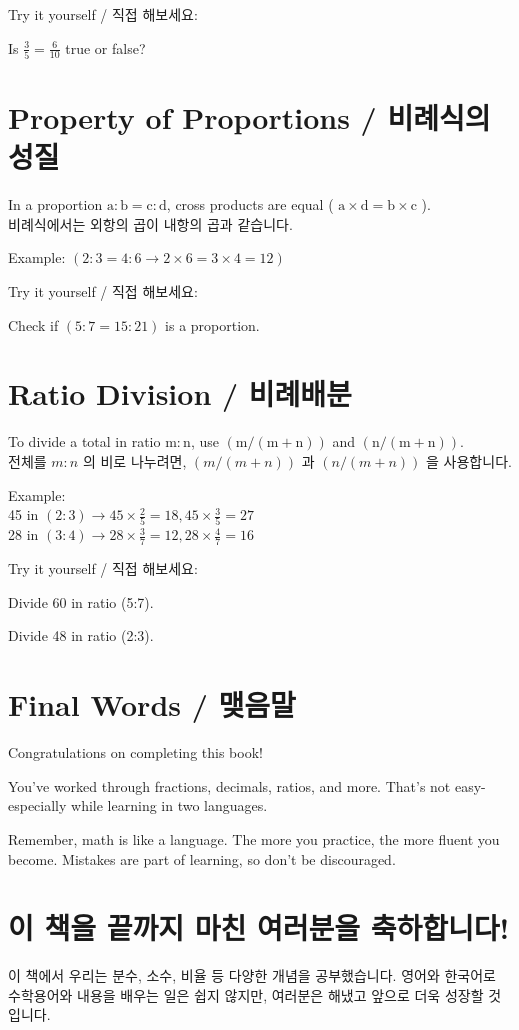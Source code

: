 \documentclass[10pt]{article}
\begin{document}
Try it yourself / 직접 해보세요:

Is $\frac{3}{5}=\frac{6}{10}$ true or false?

\section*{Property of Proportions / 비례식의 성질}
In a proportion $\mathrm{a}: \mathrm{b}=\mathrm{c}: \mathrm{d}$, cross products are equal ( $\mathrm{a} \times \mathrm{d}=\mathrm{b} \times \mathrm{c}$ ).\\
비례식에서는 외항의 곱이 내항의 곱과 같습니다.

Example: $(2: 3=4: 6 \rightarrow 2 \times 6=3 \times 4=12)$

Try it yourself / 직접 해보세요:

Check if $(5: 7=15: 21)$ is a proportion.

\section*{Ratio Division / 비례배분}
To divide a total in ratio $\mathrm{m}: \mathrm{n}$, use $(\mathrm{m} /(\mathrm{m}+\mathrm{n}))$ and $(\mathrm{n} /(\mathrm{m}+\mathrm{n}))$.\\
전체를 $m: n$ 의 비로 나누려면, $(m /(m+n))$ 과 $(n /(m+n))$ 을 사용합니다.

Example:\\
45 in $(2: 3) \rightarrow 45 \times \frac{2}{5}=18,45 \times \frac{3}{5}=27$\\
28 in $(3: 4) \rightarrow 28 \times \frac{3}{7}=12,28 \times \frac{4}{7}=16$

Try it yourself / 직접 해보세요:

Divide 60 in ratio (5:7).

Divide 48 in ratio (2:3).

\section*{Final Words / 맺음말}
Congratulations on completing this book!

You've worked through fractions, decimals, ratios, and more. That's not easy-especially while learning in two languages.

Remember, math is like a language. The more you practice, the more fluent you become. Mistakes are part of learning, so don't be discouraged.

\section*{이 책을 끝까지 마친 여러분을 축하합니다!}
이 책에서 우리는 분수, 소수, 비율 등 다양한 개념을 공부했습니다. 영어와 한국어로 수학용어와 내용을 배우는 일은 쉽지 않지만, 여러분은 해냈고 앞으로 더욱 성장할 것입니다.
\end{document}
